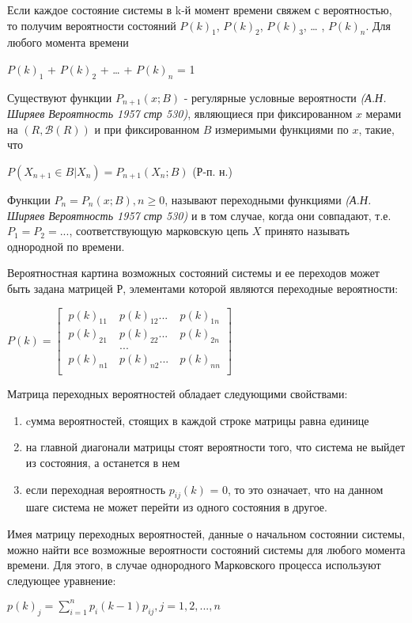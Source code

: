 Если каждое состояние системы в k-й момент времени свяжем с вероятностью, то получим вероятности состояний $P(k)_1$, $P(k)_2$, $P(k)_3$, … , $P(k)_n$. Для любого момента времени 
\begin{center}
$P(k)_1$ + $P(k)_2$ + … + $P(k)_n$ = 1
\end{center}

Существуют функции $P_{n+1} (x; B)$ - регулярные условные вероятности \textit{(А.Н. Ширяев Вероятность 1957 стр 530)}, являющиеся при фиксированном $x$ мерами на $(R,\mathscr{B}(R))$  и при фиксированном $B$ измеримыми функциями по $x$, такие, что
\begin{center}
$P(X_{n+1} \in B | X_n) = P_{n+1}(X_n; B)$ (Р-п. н.)
\end{center} 

Функции $P_n = P_n (x; B), n \geq 0$, называют переходными функциями \textit{(А.Н. Ширяев Вероятность 1957 стр 530)} и в том случае, когда они совпадают,  т.е. $P_1 = P_2 = ... $, соответствующую марковскую цепь $X$ принято называть однородной по времени.

Вероятностная картина возможных состояний системы и ее переходов может быть задана матрицей Р, элементами которой являются переходные
вероятности: 

\begin{center}

$ P(k)= \begin{bmatrix}
		\ p(k)_{11}& \ p(k)_{12}...& \ p(k)_{1n}\\
		\ p(k)_{21}& \ p(k)_{22}...& \ p(k)_{2n}\\
		\ & \ ... & \ \\
		\ p(k)_{n1}& \ p(k)_{n2}...& \ p(k)_{nn}\\
		\end{bmatrix}
$
\end{center}

Матрица переходных вероятностей обладает следующими свойствами:
\begin{enumerate}
\item cумма вероятностей, стоящих в каждой строке матрицы равна единице
\item на главной диагонали матрицы стоят вероятности того, что система не выйдет из состояния,  а останется в нем
\item если переходная вероятность $p_{ij}(k)$ = 0, то это означает, что на данном шаге система не может перейти из одного состояния в другое.
\end{enumerate}

Имея матрицу переходных вероятностей, данные о начальном состоянии системы, можно найти все возможные вероятности состояний системы для любого момента времени. Для этого, в случае однородного Марковского процесса используют следующее уравнение:
\begin{center}
$p(k)_j = \sum_{i=1}^n p_i (k-1)  p_{ij} , j = 1, 2, ... , n$
\end{center}

